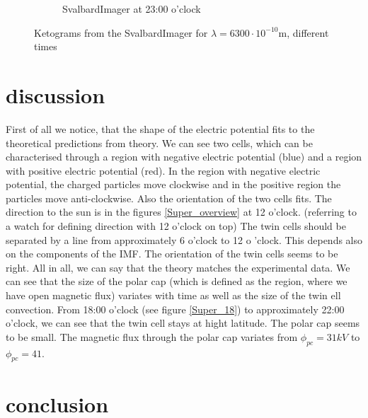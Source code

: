 \documentclass[10pt,a4paper]{article}
\begin{document}
\begin{figure}[h]
\begin{subfigure}{0.3\textwidth}
	\caption{ SvalbardImager at 23:00 o'clock \label{SBI_6_23}}
\end{subfigure}
\caption{Ketograms from the SvalbardImager for $\lambda=6300 \cdot 10^{-10} \mathrm{m}$, different times }
\label{SBI_6_timedevelop}
\end{figure}

\section{discussion \label{discussion}}


First of all we notice, that the shape of the electric potential fits to the theoretical predictions from theory. We can see two cells, which can be characterised through a region with negative electric potential (blue) and a region with positive electric potential (red). In the region with negative electric potential, the charged particles move clockwise and in the positive region the particles move anti-clockwise. 
Also the orientation of the two cells fits. The direction to the sun is in the figures \ref{Super_overview} at 12 o'clock. (referring to a watch for defining direction with 12 o'clock on top) The twin cells should be separated by a line from approximately 6 o'clock to 12 o 'clock. This depends also on the components of the IMF. The orientation of the twin cells seems to be right.   All in all, we can say that the theory matches the experimental data. 
We can see that the size of the polar cap (which is defined as the region, where we have open magnetic flux) variates with time as well as the size of the twin ell convection. From 18:00 o'clock (see figure \ref{Super_18}) to approximately 22:00 o'clock, we can see that the twin cell stays at hight latitude. The polar cap seems to be small. The magnetic flux through the polar cap variates from $\phi_{pc}=31 k V$ to $\phi_{pc}=41$. 
\section{conclusion}


 
\end{document}
